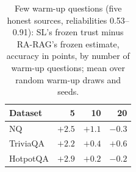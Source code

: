 \begin{table}
\centering
\small
\begin{tabular}{@{}lrrr@{}}
\toprule
Dataset & 5 & 10 & 20 \\
\midrule
NQ & $+2.5$ & $+1.1$ & $-0.3$ \\
TriviaQA & $+2.2$ & $+0.4$ & $+0.6$ \\
HotpotQA & $+2.9$ & $+0.2$ & $-0.2$ \\
\bottomrule
\end{tabular}
\caption{Few warm-up questions (five honest sources, reliabilities 0.53--0.91): SL's frozen trust minus RA-RAG's frozen estimate, accuracy in points, by number of warm-up questions; mean over random warm-up draws and seeds.}
\label{tab:warmup}
\end{table}
